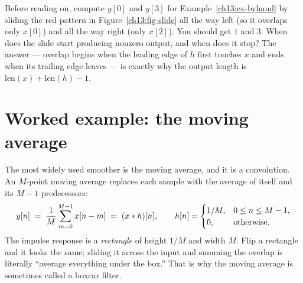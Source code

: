 \begin{walkbox}
Before reading on, compute $y[0]$ and $y[3]$ for
Example~\ref{ch13:ex-byhand} by sliding the red pattern in
Figure~\ref{ch13:fig-slide} all the way left (so it overlaps only $x[0]$) and
all the way right (only $x[2]$). You should get $1$ and $3$. When does the slide
start producing nonzero output, and when does it stop? The answer ---
overlap begins when the leading edge of $h$ first touches $x$ and ends when its
trailing edge leaves --- is exactly why the output length is
$\text{len}(x) + \text{len}(h) - 1$.
\end{walkbox}

\section{Worked example: the moving average}
\label{ch13:movavg}

The most widely used smoother is the moving average, and it is a
convolution. An $M$-point moving average replaces each sample with the average
of itself and its $M-1$ predecessors:
\begin{equation}
\label{ch13:movavg-def}
y[n] \;=\; \frac{1}{M}\sum_{m=0}^{M-1} x[n-m]
       \;=\; (x \ast h)[n], \qquad
h[n] = \begin{cases} 1/M, & 0 \le n \le M-1,\\ 0, & \text{otherwise.}\end{cases}
\end{equation}
The impulse response is a \emph{rectangle} of height $1/M$ and width $M$. Flip a
rectangle and it looks the same; sliding it across the input and summing the
overlap is literally ``average everything under the box.'' That is why the
moving average is sometimes called a boxcar filter.

